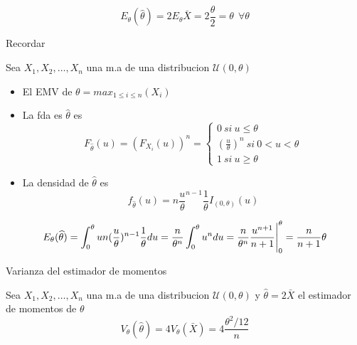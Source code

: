 \documentclass[a4paper]{article}
\begin{document}
\begin{equation*}
    E_{\theta}(\widehat{\theta}) = 2E_{\theta}\bar{X} = 2\frac{\theta}{2} = \theta \ \ \forall \theta
\end{equation*}

Recordar

Sea $X_{1},X_{2},\dots,X_{n}$ una m.a de una distribucion $\mathcal{U}(0, \theta)$
\begin{itemize}
    \item El EMV de $\theta = max_{1\leq i \leq n}(X_{i})$
    \item La fda es $\widehat{\theta}$ es
        \begin{equation*}
            F_{\widehat{\theta}}(u) = (F_{X_{i}}(u))^n =       
            \begin{cases}
                0 \ si \ u \leq \theta
                \\
                (\frac{u}{\theta})^n \ si \ 0<u<\theta
                \\
                1 \ si \ u \geq \theta
            \end{cases}
        \end{equation*}
    \item La densidad de $\widehat{\theta}$ es
        \begin{equation*}
            f_{\widehat{\theta}}(u) = n\frac{u}{\theta}^{n-1} \frac{1}{\theta} I_{(0,\theta)}(u)
        \end{equation*}
\end{itemize}

\begin{equation*}
    E_{\theta}(\widehat{\theta}) = \int_{0}^{\theta} un(\frac{u}{\theta})^{n-1} \frac{1}{\theta} du = 
    \\
    \frac{n}{\theta^n}\int_{0}^{\theta} u^n du = \frac{n}{\theta^n}\frac{u^{n+1}}{n+1}\Biggr|_{0}^{\theta} = \frac{n}{n+1}\theta
\end{equation*}

Varianza del estimador de momentos

Sea $X_{1},X_{2},\dots,X_{n}$ una m.a de una distribucion $\mathcal{U}(0, \theta)$ y $\widehat{\theta}=2\bar{X}$ el estimador de momentos de $\theta$
\begin{equation*}
    V_{\theta}(\widehat{\theta}) = 4V_{\theta}(\bar{X}) = 4 \frac{\theta^2/12}{n}
\end{equation*}
\end{document}
